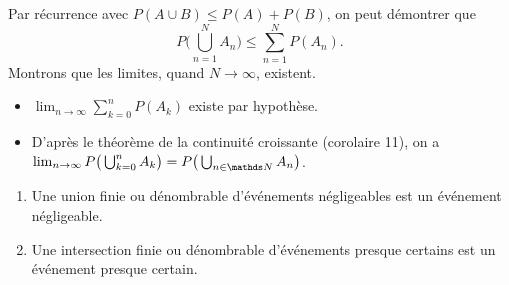 \begin{prv}
	Par récurrence avec $P(A \cup B) \le P(A) + P(B)$, on peut démontrer que \[
		P\Big(\bigcup_{n = 1}^N A_n\Big) \le \sum_{n=1}^N P(A_n)
	.\] Montrons que les limites, quand $N\to \infty$, existent.
	\begin{itemize}
		\item $\lim_{n\to \infty} \sum_{k=0}^n P(A_k)$\/ existe par hypothèse.
		\item D'après le théorème de la continuité croissante (corolaire 11), on a $\lim_{n\to \infty} P\big(\bigcup_{k=0}^n A_k\big) = P\big(\bigcup_{n \in \N} A_n\big)$.
	\end{itemize}
\end{prv}

\begin{crlr}
	\begin{enumerate}
		\item Une union finie ou dénombrable d'événements négligeables est un événement négligeable.
		\item Une intersection finie ou dénombrable d'événements presque certains est un événement presque certain.
	\end{enumerate}
\end{crlr}

